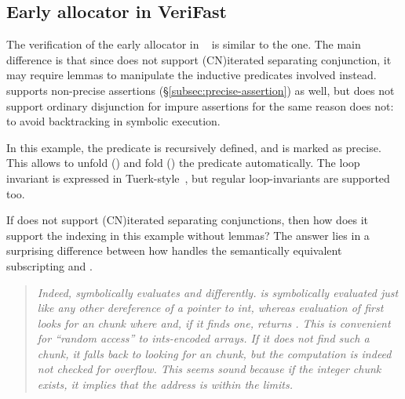 
\subsection{Early allocator in VeriFast}

The verification of the early allocator in ~ is similar to the
 one. The main difference is that since  does not support
\kl(CN){iterated separating conjunction}, it may require lemmas to manipulate the
inductive predicates involved instead.  supports non-precise
assertions (\S\ref{subsec:precise-assertion}) as well, but does not support
ordinary disjunction for impure assertions for the same reason  does
not: to avoid backtracking in symbolic
execution.

In this example, the  predicate is recursively
defined, and is marked as precise. This allows  to unfold
() and fold () the predicate automatically. The
loop invariant is expressed in Tuerk-style~, but
regular loop-invariants are supported too.


If  does not support \kl(CN){iterated separating conjunctions}, then how
does it support the indexing in this example without lemmas? The answer lies in
a surprising difference between how  handles the semantically
equivalent subscripting  and . %

\begin{quote}
    \emph{Indeed,  symbolically evaluates  and %
     differently.  is symbolically %
    evaluated just like any other dereference of a pointer to int, whereas
    evaluation of  first looks for an
     chunk where  and, if it %
    finds one, returns . This is convenient for ``random %
    access'' to ints-encoded arrays. If it does not find such a chunk, it falls
    back to looking for an  chunk, but the %
     computation is indeed not checked for overflow. This
    seems sound because if the integer chunk exists, it implies that the
    address is within the limits.}
\end{quote}

